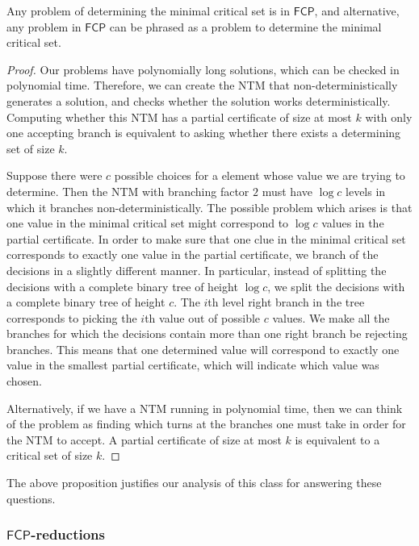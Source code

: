 \documentclass[runningheads,a4paper]{llncs}
\begin{document}
\begin{proposition}
Any problem of determining the minimal critical set is in $\mathsf{FCP}$, and alternative, any problem in $\mathsf{FCP}$ can be phrased as a problem to determine the minimal critical set.
\end{proposition}

\begin{proof}
Our problems have polynomially long solutions, which can be checked in polynomial time. Therefore, we can create the NTM that non-deterministically generates a solution, and checks whether the solution works deterministically. Computing whether this NTM has a partial certificate of size at most $k$ with only one accepting branch is equivalent to asking whether there exists a determining set of size $k$. 

Suppose there were $c$ possible choices for a element whose value we are trying to determine. Then the NTM with branching factor $2$ must have $\log c$ levels in which it branches non-deterministically. The possible problem which arises is that one value in the minimal critical set might correspond to $\log c$ values in the partial certificate. In order to make sure that one clue in the minimal critical set corresponds to exactly one value in the partial certificate, we branch of the decisions in a slightly different manner. In particular, instead of splitting the decisions with a complete binary tree of height $\log c$, we split the decisions with a complete binary tree of height $c$. The $i$th level right branch in the tree corresponds to picking the $i$th value out of possible $c$ values. We make all the branches for which the decisions contain more than one right branch be rejecting branches. This means that one determined value will correspond to exactly one value in the smallest partial certificate, which will indicate which value was chosen.

Alternatively, if we have a NTM running in polynomial time, then we can think of the problem as finding which turns at the branches one must take in order for the NTM to accept. A partial certificate of size at most $k$ is equivalent to a critical set of size $k$.
\end{proof}

The above proposition justifies our analysis of this class for answering these questions.

\subsubsection{$\mathsf{FCP}$-reductions}
\end{document}
